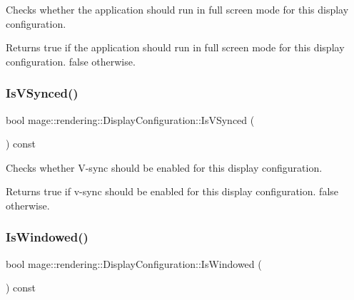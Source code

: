 Checks whether the application should run in full screen mode for this display configuration.

\begin{DoxyReturn}{Returns}
{\ttfamily true} if the application should run in full screen mode for this display configuration. {\ttfamily false} otherwise. 
\end{DoxyReturn}
\mbox{\label{classmage_1_1rendering_1_1_display_configuration_a6447404f1d720b98b37f684ba0e790a0}} 
\subsubsection{\texorpdfstring{Is\+V\+Synced()}{IsVSynced()}}
{\footnotesize\ttfamily bool mage\+::rendering\+::\+Display\+Configuration\+::\+Is\+V\+Synced (\begin{DoxyParamCaption}{ }\end{DoxyParamCaption}) const\hspace{0.3cm}{\ttfamily [noexcept]}}

Checks whether V-\/sync should be enabled for this display configuration.

\begin{DoxyReturn}{Returns}
{\ttfamily true} if v-\/sync should be enabled for this display configuration. {\ttfamily false} otherwise. 
\end{DoxyReturn}
\mbox{\label{classmage_1_1rendering_1_1_display_configuration_acbe793e625311707e234fcd0977978d5}} 
\subsubsection{\texorpdfstring{Is\+Windowed()}{IsWindowed()}}
{\footnotesize\ttfamily bool mage\+::rendering\+::\+Display\+Configuration\+::\+Is\+Windowed (\begin{DoxyParamCaption}{ }\end{DoxyParamCaption}) const\hspace{0.3cm}{\ttfamily [noexcept]}}

